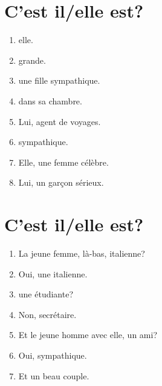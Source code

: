 \section{C'est  il/elle est?}

\begin{enumerate}
    \item {} elle.
    \item {} grande.
    \item {} une fille sympathique.
    \item {} dans sa chambre.
    \item Lui,  agent de voyages.
    \item {} sympathique.
    \item Elle,  une femme célèbre.
    \item Lui,  un garçon sérieux. 
\end{enumerate}

\section{C'est  il/elle est?}

\begin{enumerate}
    \item La jeune femme, là-bas,  italienne?
    \item Oui,  une italienne.
    \item {} une étudiante?
    \item Non,  secrétaire.
    \item Et le jeune homme avec elle,  un ami?
    \item Oui,  sympathique.
    \item Et  un beau couple.
\end{enumerate}